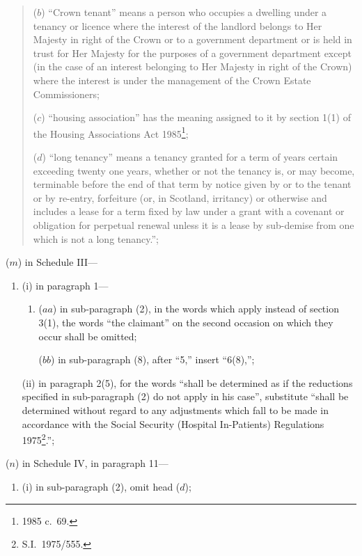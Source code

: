 \documentclass[12pt,a4paper]{article}
\begin{document}
\begin{enumerate}
\begin{enumerate}
\begin{quotation}
\begin{enumerate}
($b$) “Crown tenant” means a person who occupies a dwelling under a tenancy or licence where the interest of the landlord belongs to Her Majesty in right of the Crown or to a government department or is held in trust for Her Majesty for the purposes of a government department except (in the case of an interest belonging to Her Majesty in right of the Crown) where the interest is under the management of the Crown Estate Commissioners;

($c$) “housing association” has the meaning assigned to it by section 1(1) of the Housing Associations Act 1985\footnote{1985 c.\ 69.};

($d$) “long tenancy” means a tenancy granted for a term of years certain exceeding twenty one years, whether or not the tenancy is, or may become, terminable before the end of that term by notice given by or to the tenant or by re-entry, forfeiture (or, in Scotland, irritancy) or otherwise and includes a lease for a term fixed by law under a grant with a covenant or obligation for perpetual renewal unless it is a lease by sub-demise from one which is not a long tenancy.”;
\end{enumerate}
\end{quotation}
\end{enumerate}

($m$) in Schedule III—
\begin{enumerate}\item[]
(i) in paragraph 1—
\begin{enumerate}\item[]
($aa$) in sub-paragraph (2), in the words which apply instead of section 3(1), the words “the claimant” on the second occasion on which they occur shall be omitted;

\pagebreak[3]

($bb$) in sub-paragraph (8), after “5,” insert “6(8),”;
\end{enumerate}

(ii) in paragraph 2(5), for the words “shall be determined as if the reductions specified in sub-paragraph (2) do not apply in his case”, substitute
    “shall be determined without regard to any adjustments which fall to be made in accordance with the Social Security (Hospital In-Patients) Regulations 1975\footnote{S.I.\ 1975/555.}.”; 
\end{enumerate}

($n$) in Schedule IV, in paragraph 11—
\begin{enumerate}\item[]
(i) in sub-paragraph (2), omit head ($d$);


\end{enumerate}
\end{enumerate}
\end{document}
